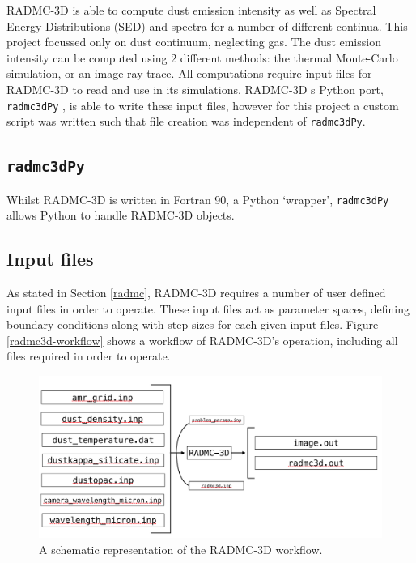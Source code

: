 \documentclass{report}
\begin{document}
RADMC-3D is able to compute dust emission intensity as well as Spectral Energy Distributions (SED) and spectra for a number of different continua. This project focussed only on dust continuum, neglecting gas. The dust emission intensity can be computed using 2 different methods: the thermal Monte-Carlo simulation, or an image ray trace. All computations require input files for RADMC-3D to read and use in its simulations. RADMC-3D \textquotesingle s Python port, \texttt{radmc3dPy} \parencite{radmc3dPy}, is able to write these input files, however for this project a custom script was written such that file creation was independent of \texttt{radmc3dPy}.

\subsection{\texttt{radmc3dPy}}
Whilst RADMC-3D is written in Fortran 90, a Python ‘wrapper’, \texttt{radmc3dPy} allows Python to handle RADMC-3D objects.

\subsection{Input files} \label{inp}
As stated in Section \ref{radmc}, RADMC-3D requires a number of user defined input files in order to operate. These input files act as parameter spaces, defining boundary conditions along with step sizes for each given input files. Figure \ref{radmc3d-workflow} shows a workflow of RADMC-3D's operation, including all files required in order to operate.

\begin{figure}[h]
  \centering
  \includegraphics[scale=0.4]{../img/radmc3d-workflow}
  \caption[A schematic representation of the RADMC-3D workflow.]{A schematic representation of the RADMC-3D workflow.}
  \label{fig:radmc3d-workflow}
\end{figure}
\end{document}
